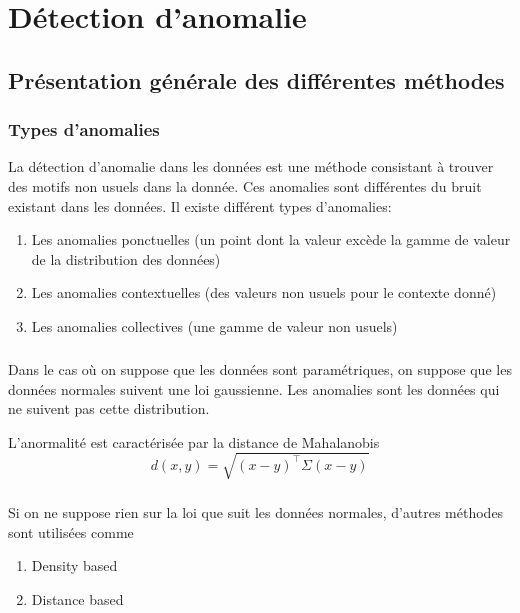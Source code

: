 
\chapter{Détection d'anomalie}

\section{Présentation générale des différentes méthodes}
\subsection{Types d'anomalies}
La détection d'anomalie dans les données est une méthode consistant à trouver des motifs non 
usuels dans la donnée. Ces anomalies sont différentes du bruit existant dans les données.
Il existe différent types d'anomalies:
\begin{enumerate}
\item Les anomalies ponctuelles (un point dont la valeur excède la gamme de valeur de la distribution des données)
\item Les anomalies contextuelles (des valeurs non usuels pour le contexte donné)
\item Les anomalies collectives (une gamme de valeur non usuels)
\end{enumerate}

\paragraph{}
Dans le cas où on suppose que les données sont paramétriques, on suppose
que les données normales suivent une loi gaussienne.
Les anomalies sont les données qui ne suivent pas cette distribution.

L'anormalité est caractérisée par la distance de Mahalanobis
\begin{equation}
d(x,y) = \sqrt{(x-y)^\top \Sigma (x-y)} 
\end{equation}
\paragraph{}
Si on ne suppose rien sur la loi que suit les données normales, d'autres méthodes sont utilisées comme 

\begin{enumerate}
\item Density based
\item Distance based
\end{enumerate}

